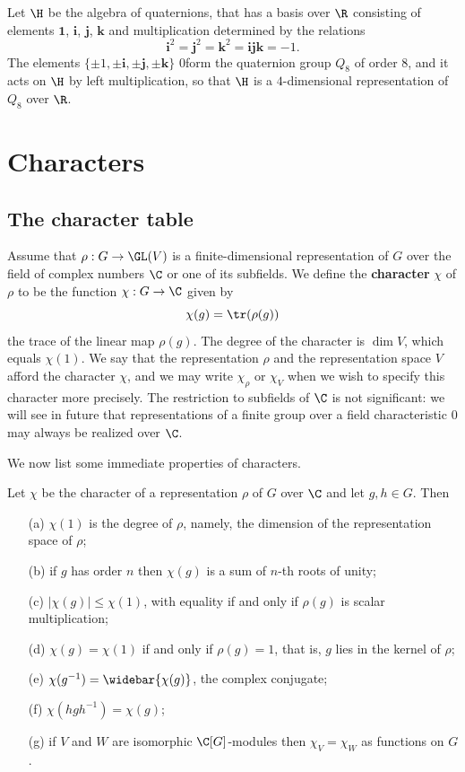\begin{example}\label{representation of Q_8 is H}
Let $\H$ be the algebra of quaternions, that has a basis over $\R$ consisting of elements $\mathbf{1}$, $\mathbf{i}$, $\mathbf{j}$, $\mathbf{k}$ and multiplication determined by the relations
\[\mathbf{i}^2=\mathbf{j}^2=\mathbf{k}^2=\mathbf{ijk}=-1.\]
The elements $\{\pm 1,\pm\mathbf{i},\pm\mathbf{j},\pm\mathbf{k}\}$ 0form the quaternion group $Q_8$ of order $8$, and it acts on $\H$ by left multiplication, so that $\H$ is a $4$-dimensional representation of $Q_8$ over $\R$.
\end{example}
\section{Characters}
\subsection{The character table}
Assume that $\rho:G\to\GL(V)$ is a finite-dimensional representation of $G$ over the field of complex numbers $\C$ or one of its subfields. We define the \textbf{character} $\chi$ of $\rho$ to be the function $\chi:G\to\C$ given by
\[\chi(g)=\tr(\rho(g))\]
the trace of the linear map $\rho(g)$. The degree of the character is $\dim V$, which equals $\chi(1)$. We say that the representation $\rho$ and the representation space $V$ afford the character $\chi$, and we may write $\chi_{\rho}$ or $\chi_{V}$ when we wish to specify this character more precisely. The restriction to subfields of $\C$ is not significant: we will see in future that representations of a finite group over a field characteristic $0$ may always be realized over $\C$.\par
We now list some immediate properties of characters.
\begin{proposition}\label{character prop}
Let $\chi$ be the character of a representation $\rho$ of $G$ over $\C$ and let $g,h\in G$. Then
\begin{itemize}
\item[(a)] $\chi(1)$ is the degree of $\rho$, namely, the dimension of the representation space of $\rho$;
\item[(b)] if $g$ has order $n$ then $\chi(g)$ is a sum of $n$-th roots of unity;
\item[(c)] $|\chi(g)|\leq\chi(1)$, with equality if and only if $\rho(g)$ is scalar multiplication;
\item[(d)] $\chi(g)=\chi(1)$ if and only if $\rho(g)=1$, that is, $g$ lies in the kernel of $\rho$;
\item[(e)] $\chi(g^{-1})=\widebar{\chi(g)}$, the complex conjugate;
\item[(f)] $\chi(hgh^{-1})=\chi(g)$;
\item[(g)] if $V$ and $W$ are isomorphic $\C[G]$-modules then $\chi_V=\chi_W$ as functions on $G$.
\end{itemize}
\end{proposition}
